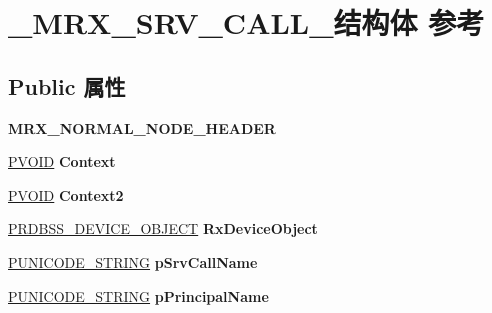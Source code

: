 \hypertarget{struct___m_r_x___s_r_v___c_a_l_l__}{}\section{\+\_\+\+M\+R\+X\+\_\+\+S\+R\+V\+\_\+\+C\+A\+L\+L\+\_\+结构体 参考}
\label{struct___m_r_x___s_r_v___c_a_l_l__}
\subsection*{Public 属性}
\begin{DoxyCompactItemize}
\item 
\mbox{\label{struct___m_r_x___s_r_v___c_a_l_l___a0da7fcf6c54f7d0d94c7a3ab4e5a750c}} 
{\bfseries M\+R\+X\+\_\+\+N\+O\+R\+M\+A\+L\+\_\+\+N\+O\+D\+E\+\_\+\+H\+E\+A\+D\+ER}
\item 
\mbox{\label{struct___m_r_x___s_r_v___c_a_l_l___aaa5c5f7f19f045e861a928b0dbe6354a}} 
\hyperlink{interfacevoid}{P\+V\+O\+ID} {\bfseries Context}
\item 
\mbox{\label{struct___m_r_x___s_r_v___c_a_l_l___a1e74d8cf8cd64632bd495205fea4f0d7}} 
\hyperlink{interfacevoid}{P\+V\+O\+ID} {\bfseries Context2}
\item 
\mbox{\label{struct___m_r_x___s_r_v___c_a_l_l___a247ff315a33db7f94ca498e03a04b0d8}} 
\hyperlink{struct___r_d_b_s_s___d_e_v_i_c_e___o_b_j_e_c_t}{P\+R\+D\+B\+S\+S\+\_\+\+D\+E\+V\+I\+C\+E\+\_\+\+O\+B\+J\+E\+CT} {\bfseries Rx\+Device\+Object}
\item 
\mbox{\label{struct___m_r_x___s_r_v___c_a_l_l___ace4c63d2d4bf55e5672911e32962d9b0}} 
\hyperlink{struct___u_n_i_c_o_d_e___s_t_r_i_n_g}{P\+U\+N\+I\+C\+O\+D\+E\+\_\+\+S\+T\+R\+I\+NG} {\bfseries p\+Srv\+Call\+Name}
\item 
\mbox{\label{struct___m_r_x___s_r_v___c_a_l_l___ae4c159798073c3bcea4e4f4907df02d3}} 
\hyperlink{struct___u_n_i_c_o_d_e___s_t_r_i_n_g}{P\+U\+N\+I\+C\+O\+D\+E\+\_\+\+S\+T\+R\+I\+NG} {\bfseries p\+Principal\+Name}
\item 

\end{DoxyCompactItemize}
